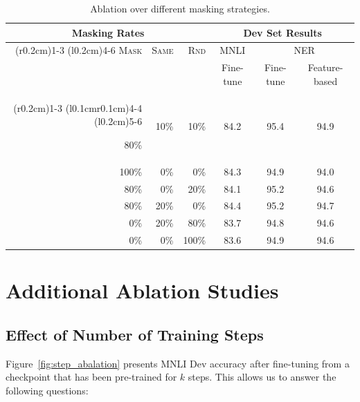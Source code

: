\begin{table}[ht]
\begin{center}
{\small
\begin{tabular}{@{}rrrccc@{}}
  \toprule
  \multicolumn{3}{c}{Masking Rates} & \multicolumn{3}{c}{Dev Set Results} \\
  \cmidrule(r{0.2cm}){1-3}
  \cmidrule(l{0.2cm}){4-6}
  \textsc{Mask} &	\textsc{Same}&	\textsc{Rnd}	& {MNLI} &	\multicolumn{2}{c}{NER}\\
   &  & & {\footnotesize Fine-tune} &   {\footnotesize Fine-tune}	& {\footnotesize Feature-based}\\
    \cmidrule(r{0.2cm}){1-3}
  \cmidrule(l{0.1cm}r{0.1cm}){4-4}
  \cmidrule(l{0.2cm}){5-6}
  
  80\%	&10\%	&10\%	&84.2	&95.4	&94.9\\
100\%	&0\%	&0\%	&84.3	&94.9	&94.0\\
80\%	&0\%	&20\%	&84.1	&95.2	&94.6\\
80\%	&20\%	&0\%	&84.4	&95.2	&94.7\\
0\%	&20\%	&80\%	&83.7	&94.8	&94.6 \\
0\%	&0\%	&100\%	&83.6	&94.9	&94.6\\
\bottomrule
\end{tabular}
} %
\end{center}
\caption{\label{tab:mask_ablation} Ablation over different masking strategies.}
\end{table}





\section{Additional Ablation Studies}
\label{appendix:sec:more_ablation_studies}

\subsection{Effect of Number of Training Steps}
\label{sec:num_training_steps}

Figure~\ref{fig:step_abalation} presents MNLI Dev accuracy after fine-tuning from a checkpoint that has been pre-trained for $k$ steps. This allows us to answer the following questions:



